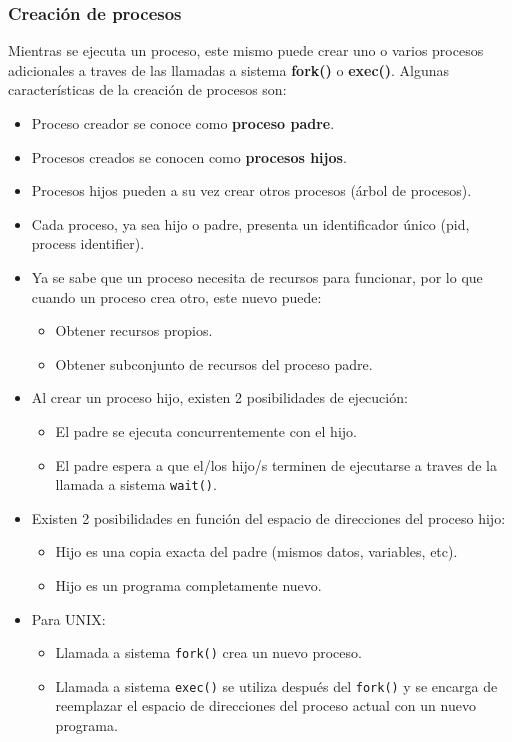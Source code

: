 \documentclass{templateNote}
\begin{document}
\subsubsection*{Creación de procesos}
Mientras se ejecuta un proceso, este mismo puede crear uno o varios procesos adicionales a traves de las llamadas a sistema \textbf{fork()} o \textbf{exec()}. Algunas características de la creación de procesos son:
\begin{itemize}
    \item Proceso creador se conoce como \textbf{proceso padre}.
    \item Procesos creados se conocen como \textbf{procesos hijos}.
    \item Procesos hijos pueden a su vez crear otros procesos (árbol de procesos).
    \item Cada proceso, ya sea hijo o padre, presenta un identificador único (pid, process identifier).
    \item Ya se sabe que un proceso necesita de recursos para funcionar, por lo que cuando un proceso crea otro, este nuevo puede:
    \begin{itemize}
        \item Obtener recursos propios.
        \item Obtener subconjunto de recursos del proceso padre.
    \end{itemize}
    \item Al crear un proceso hijo, existen 2 posibilidades de ejecución:
    \begin{itemize}
        \item El padre se ejecuta concurrentemente con el hijo.
        \item El padre espera a que el/los hijo/s terminen de ejecutarse a traves de la llamada a sistema \texttt{wait()}.
    \end{itemize}
    \item Existen 2 posibilidades en función del espacio de direcciones del proceso hijo:
    \begin{itemize}
        \item Hijo es una copia exacta del padre (mismos datos, variables, etc).
        \item Hijo es un programa completamente nuevo.
    \end{itemize}
    \item Para UNIX:
    \begin{itemize}
        \item Llamada a sistema \texttt{fork()} crea un nuevo proceso.
        \item Llamada a sistema \texttt{exec()} se utiliza después del \texttt{fork()} y se encarga de reemplazar el espacio de direcciones del proceso actual con un nuevo programa.
    \end{itemize}
\end{itemize}
\end{document}
